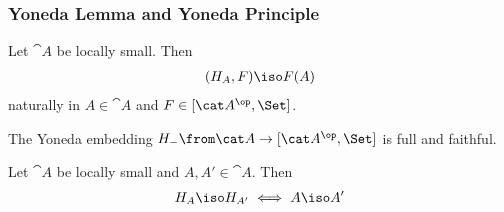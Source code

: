 \documentclass{beamer}
\begin{document}
\begin{frame}
  \frametitle{Yoneda Lemma and Yoneda Principle}
  \begin{lemma}[Yoneda]
    Let $\cat A$ be locally small. Then
    \begin{align*}
      [\cat A^\op,\Set](H_A,F)\iso F(A)
    \end{align*}
    naturally in $A\in\cat A$ and $F\in [\cat A^\op,\Set]$.
  \end{lemma}
  \begin{theorem}
    The Yoneda embedding $H_-\from \cat A\to[\cat A^\op,\Set]$ is full and faithful.
  \end{theorem}
  \begin{corollary}
    Let $\cat A$ be locally small and $A,A'\in\cat A$. Then
    \begin{align*}
      H_A\iso H_{A'} \iff A\iso A'
    \end{align*}
  \end{corollary}
\end{frame}
\end{document}
